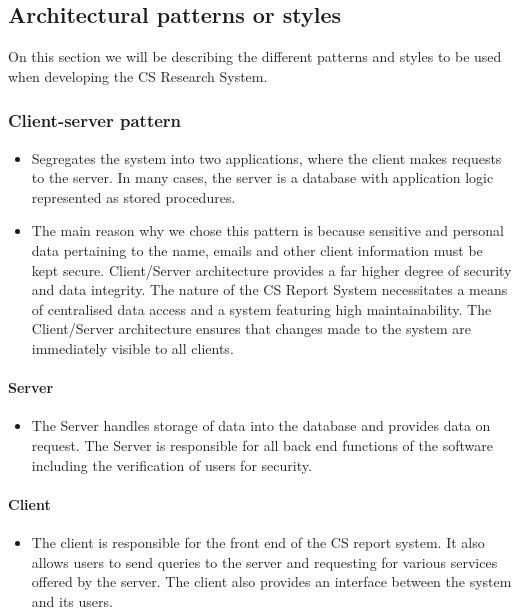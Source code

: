 \documentclass{article}
\begin{document}
		\subsection{Architectural patterns or styles}
		On this section we will be describing the different patterns and styles to be used when developing the CS 		        Research System.
		\setcounter{secnumdepth}{5}
		\subsubsection{Client-server pattern} %
		\begin{itemize}
			\item Segregates the system into two applications, where the client makes requests to the server. In many 				cases, the server is a database with application logic represented as stored procedures.
			
			
			\item  The main reason why we chose this pattern is because sensitive and personal data pertaining to the 				name, emails and other client information must be kept secure. Client/Server architecture provides a far 			higher 	degree of security and data integrity. The nature of the CS Report System necessitates a means of 				centralised data access and a system featuring high maintainability. The Client/Server architecture ensures that changes 	made to the system are immediately visible to all clients.
		\end{itemize}
		\paragraph{Server} %
		\begin{itemize}
			\item The Server handles storage of data into the database and provides data on request. The Server is responsible for all back end functions of the software including the verification 	of users for security.
			
		\end{itemize}
		\paragraph{Client} %
		\begin{itemize}
			\item The client is responsible for the front end of the CS report system. It also allows users to 	send 			queries to the server and requesting for various services offered by the server. The 	client also provides 			an interface between the system  and its users.  	
		\end{itemize}
		
\end{document}
